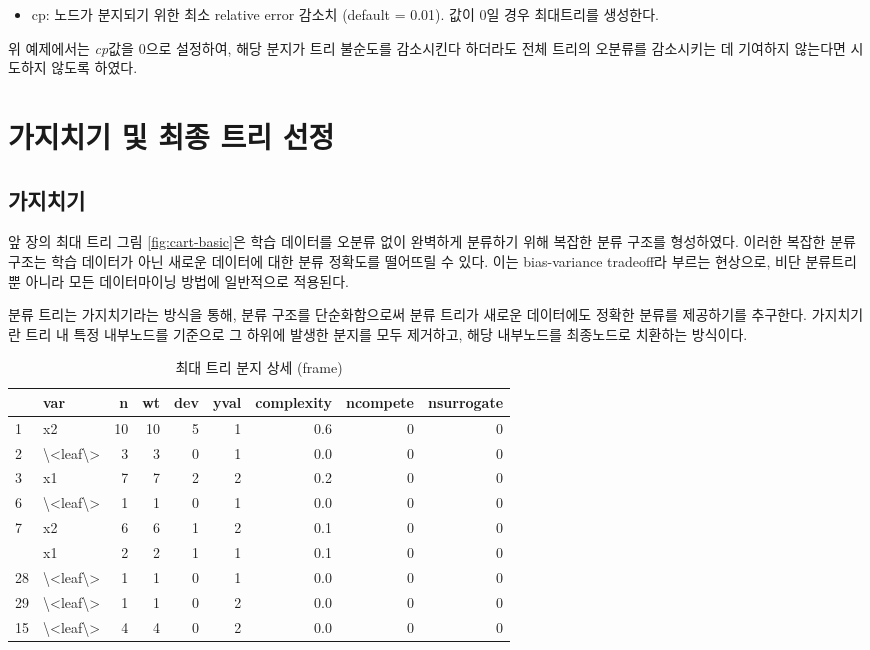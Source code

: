 \documentclass[]{book}
\providecommand{\tightlist}{%
  \setlength{\itemsep}{0pt}\setlength{\parskip}{0pt}}
\begin{document}
\begin{itemize}
\tightlist
\item
  cp: 노드가 분지되기 위한 최소 relative error 감소치 (default = 0.01). 값이 0일 경우 최대트리를 생성한다.
\end{itemize}

위 예제에서는 \emph{cp}값을 0으로 설정하여, 해당 분지가 트리 불순도를 감소시킨다 하더라도 전체 트리의 오분류를 감소시키는 데 기여하지 않는다면 시도하지 않도록 하였다.

\hypertarget{cart-pruning-complete}{%
\section{가지치기 및 최종 트리 선정}\label{cart-pruning-complete}}

\hypertarget{cart-pruning}{%
\subsection{가지치기}\label{cart-pruning}}

앞 장의 최대 트리 그림 \ref{fig:cart-basic}은 학습 데이터를 오분류 없이 완벽하게 분류하기 위해 복잡한 분류 구조를 형성하였다. 이러한 복잡한 분류 구조는 학습 데이터가 아닌 새로운 데이터에 대한 분류 정확도를 떨어뜨릴 수 있다. 이는 bias-variance tradeoff라 부르는 현상으로, 비단 분류트리 뿐 아니라 모든 데이터마이닝 방법에 일반적으로 적용된다.

분류 트리는 가지치기라는 방식을 통해, 분류 구조를 단순화함으로써 분류 트리가 새로운 데이터에도 정확한 분류를 제공하기를 추구한다. 가지치기란 트리 내 특정 내부노드를 기준으로 그 하위에 발생한 분지를 모두 제거하고, 해당 내부노드를 최종노드로 치환하는 방식이다.

\begin{table}[t]

\caption{\label{tab:max-frame}최대 트리 분지 상세 (frame)}
\centering
\begin{tabular}{llrrrrrrr}
\toprule
  & var & n & wt & dev & yval & complexity & ncompete & nsurrogate\\
\midrule
1 & x2 & 10 & 10 & 5 & 1 & 0.6 & 0 & 0\\
2 & \textbackslash{}<leaf\textbackslash{}> & 3 & 3 & 0 & 1 & 0.0 & 0 & 0\\
3 & x1 & 7 & 7 & 2 & 2 & 0.2 & 0 & 0\\
6 & \textbackslash{}<leaf\textbackslash{}> & 1 & 1 & 0 & 1 & 0.0 & 0 & 0\\
7 & x2 & 6 & 6 & 1 & 2 & 0.1 & 0 & 0\\
\addlinespace
14 & x1 & 2 & 2 & 1 & 1 & 0.1 & 0 & 0\\
28 & \textbackslash{}<leaf\textbackslash{}> & 1 & 1 & 0 & 1 & 0.0 & 0 & 0\\
29 & \textbackslash{}<leaf\textbackslash{}> & 1 & 1 & 0 & 2 & 0.0 & 0 & 0\\
15 & \textbackslash{}<leaf\textbackslash{}> & 4 & 4 & 0 & 2 & 0.0 & 0 & 0\\
\bottomrule
\end{tabular}
\end{table}
\end{document}
